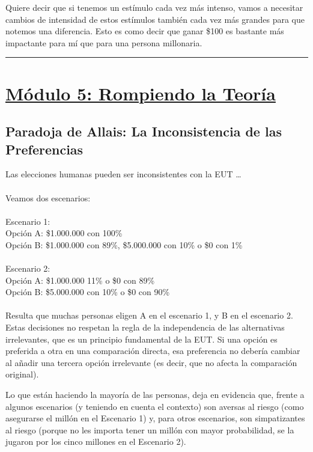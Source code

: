 \documentclass{article}
\newcommand*\sepline{%
  \begin{center}
    \rule[1ex]{.5\textwidth}{.5pt}
  \end{center}}
\begin{document}
            Quiere decir que si tenemos un estímulo cada vez más intenso, vamos a necesitar cambios de intensidad de estos estímulos también cada vez más grandes para que notemos una diferencia. Esto es como decir que ganar \$100 es bastante más impactante para mí que para una persona millonaria.

    \sepline
            
    \section*{\underline{Módulo 5: Rompiendo la Teoría}}
        \subsection*{Paradoja de Allais: La Inconsistencia de las Preferencias}
            Las elecciones humanas pueden ser inconsistentes con la EUT \ldots \\
            \\
            Veamos dos escenarios: \\
            \\
            Escenario 1: \\
            Opción A: \$1.000.000 con 100\% \\
            Opción B: \$1.000.000 con 89\%, \$5.000.000 con 10\% o \$0 con 1\% \\
            \\
            Escenario 2: \\
            Opción A: \$1.000.000 11\% o \$0 con 89\% \\
            Opción B: \$5.000.000 con 10\% o \$0 con 90\% \\
            \\
            Resulta que muchas personas eligen A en el escenario 1, y B en el escenario 2. Estas decisiones no respetan la regla de la independencia de las alternativas irrelevantes, que es un principio fundamental de la EUT. Si una opción es preferida a otra en una comparación directa, esa preferencia no debería cambiar al añadir una tercera opción irrelevante (es decir, que no afecta la comparación original).

            Lo que están haciendo la mayoría de las personas, deja en evidencia que, frente a algunos escenarios (y teniendo en cuenta el contexto) son aversas al riesgo (como asegurarse el millón en el Escenario 1) y, para otros escenarios, son simpatizantes al riesgo (porque no les importa tener un millón con mayor probabilidad, se la jugaron por los cinco millones en el Escenario 2).
\end{document}
